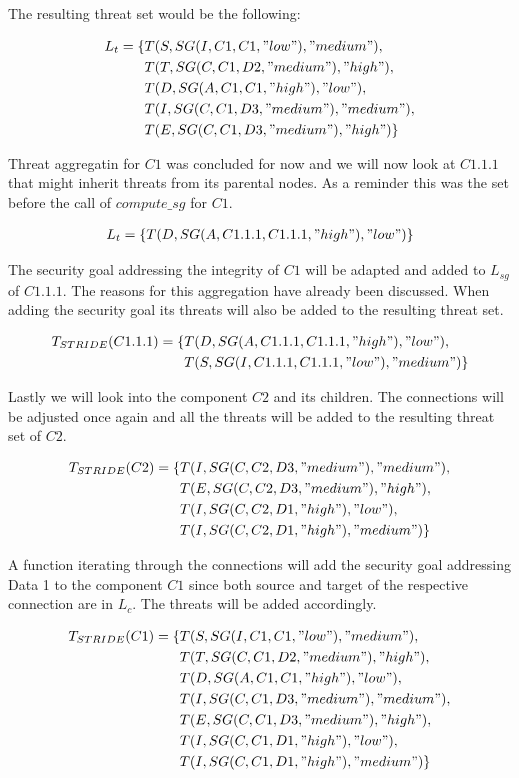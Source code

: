 The resulting threat set would be the following:

\begin{align*}
L_t = \{&T(S, SG(I,C1,C1,"low"), "medium"), \\
&T(T, SG(C,C1,D2,"medium"), "high"), \\
&T(D, SG(A,C1,C1,"high"), "low"), \\
&T(I, SG(C,C1,D3,"medium"), "medium"), \\
&T(E, SG(C,C1,D3,"medium"), "high")\}
\end{align*}

Threat aggregatin for $C1$ was concluded for now and we will now look at $C1.1.1$ that might inherit threats from its parental nodes. As a reminder this was the set before the call of $compute\_sg$ for $C1$.

\begin{align*}
L_t = \{T(D, SG(A,C1.1.1,C1.1.1,"high"), "low")\}
\end{align*}

The security goal addressing the integrity of $C1$ will be adapted and added to $L_{sg}$ of $C1.1.1$. The reasons for this aggregation have already been discussed. When adding the security goal its threats will also be added to the resulting threat set.

\begin{align*}
T_{STRIDE}(C1.1.1) = \{&T(D, SG(A,C1.1.1,C1.1.1,"high"), "low"), \\
&T(S, SG(I,C1.1.1,C1.1.1,"low"), "medium")\}
\end{align*}

Lastly we will look into the component $C2$ and its children. The connections will be adjusted once again and all the threats will be added to the resulting threat set of $C2$. 

\begin{align*}
T_{STRIDE}(C2) = \{&T(I, SG(C,C2,D3,"medium"), "medium"), \\
&T(E, SG(C,C2,D3,"medium"), "high"), \\
&T(I, SG(C,C2,D1,"high"), "low"), \\
&T(I, SG(C,C2,D1,"high"), "medium")
\}
\end{align*}

A function iterating through the connections will add the security goal addressing Data 1 to the component $C1$ since both source and target of the respective connection are in $L_c$. The threats will be added accordingly.

\begin{align*}
T_{STRIDE}(C1) = \{&T(S, SG(I,C1,C1,"low"), "medium"), \\
&T(T, SG(C,C1,D2,"medium"), "high"), \\
&T(D, SG(A,C1,C1,"high"), "low"), \\
&T(I, SG(C,C1,D3,"medium"), "medium"), \\
&T(E, SG(C,C1,D3,"medium"), "high"), \\
&T(I, SG(C,C1,D1,"high"), "low"), \\
&T(I, SG(C,C1,D1,"high"), "medium")
\}
\end{align*}

